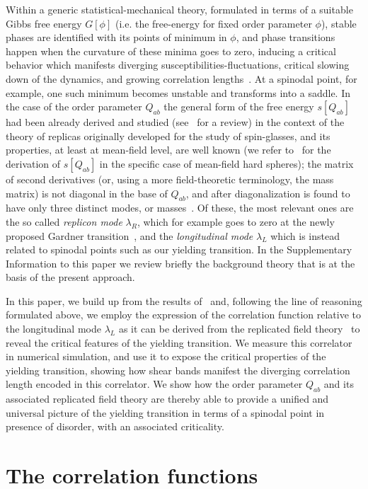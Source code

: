 \documentclass[9pt,twocolumn,twoside]{pnas-new}
\begin{document}
Within a generic statistical-mechanical theory, formulated in terms of a suitable Gibbs free energy $G[\phi]$ (i.e. the free-energy for fixed order parameter $\phi$), stable phases are identified with its points of minimum in $\phi$, and phase transitions happen when the curvature of these minima goes to zero, inducing a critical behavior which manifests diverging susceptibilities-fluctuations, critical slowing down of the dynamics, and growing correlation lengths~\cite{02Z-J}. At a spinodal point, for example, one such minimum becomes unstable and transforms into a saddle. In the case of the order parameter $Q_{ab}$ the general form of the free energy $s[Q_{ab}]$ had been already derived and studied (see~\cite{98DKT} for a review) in the context of the theory of replicas originally developed for the study of spin-glasses, and its properties, at least at mean-field level, are well known (we refer to~\cite{15RUYZ,16RU} for the derivation of $s[Q_{ab}]$ in the specific case of mean-field hard spheres); the matrix of second derivatives (or, using a more field-theoretic terminology, the mass matrix) is not diagonal in the base of $Q_{ab}$, and after diagonalization is found to have only three distinct modes, or masses~\cite{98DKT}. Of these, the most relevant ones are the so called \emph{replicon mode} $\lambda_R$, which for example goes to zero at the newly proposed Gardner transition~\cite{14CKPUZ}, and the \emph{longitudinal mode} $\lambda_L$ which is instead related to spinodal points \cite{16RU,16UZ} such as our yielding transition.  In the Supplementary Information to this paper we review briefly the background theory
that is at the basis of the present approach.

In this paper, we build up from the results of~\cite{16JPRS} and, following the line of reasoning formulated above, we employ the expression of the correlation function relative to the longitudinal mode $\lambda_L$ as it can be derived from the replicated field theory~\cite{98DKT} to reveal the critical features of the yielding transition. We measure this correlator in numerical simulation, and use it to expose the critical properties of the yielding transition, showing how shear bands manifest the diverging correlation length encoded in this correlator. We show how the order parameter $Q_{ab}$ and its associated replicated field theory are thereby able to provide a unified and universal picture of the yielding transition in terms of a spinodal point in presence of disorder, with an associated criticality.

\section*{The correlation functions\label{sec:def}}
\end{document}
